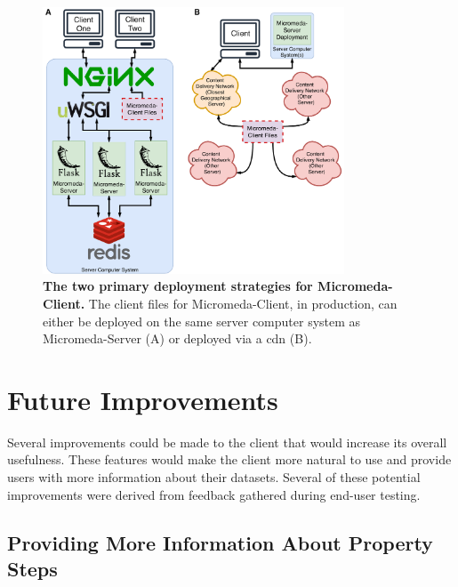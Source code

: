 \begin{figure}[!ht]
  \centering
	\includegraphics[width=0.8\textwidth]{media/micromeda-client-deployment.pdf}
	 \caption[The two primary deployment strategies for 
Micromeda-Client.]{\textbf{The two primary deployment strategies for 
Micromeda-Client.} The client files for Micromeda-Client, in production, can 
either be deployed on the same server computer system as Micromeda-Server (A) or 
deployed via a \gls{cdn} (B).}
	 \label{fig:client-deployment}
\end{figure}

\section{Future Improvements} \label{client-improvements}

Several improvements could be made to the client that would increase its overall 
usefulness. These features would make the client more natural to use and provide 
users with more information about their datasets. Several of these potential 
improvements were derived from feedback gathered during end-user testing.

\subsection{Providing More Information About Property Steps}

